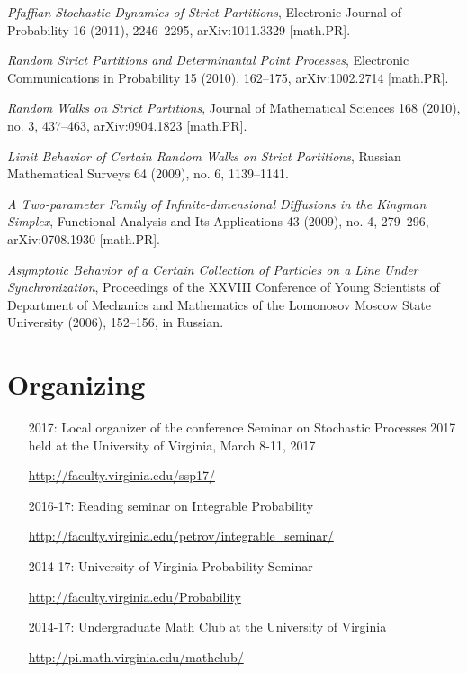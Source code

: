 \documentclass[letterpaper,11pt]{article}
\begin{document}
\begin{etaremune}
	      \emph{Pfaffian Stochastic Dynamics of Strict Partitions},
	      Electronic Journal of Probability 16 (2011), 2246--2295,
	      arXiv:1011.3329
	      [math.PR].
	\item
	      \emph{Random Strict Partitions and Determinantal Point
		      Processes},
	      Electronic Communications in Probability 15 (2010), 162--175,
	      arXiv:1002.2714
	      [math.PR].
	\item
	      \emph{Random Walks on Strict Partitions}, Journal of
	      Mathematical
	      Sciences 168 (2010), no. 3, 437--463, arXiv:0904.1823 [math.PR].
	\item
	      \emph{Limit Behavior of Certain Random Walks on Strict
		      Partitions},
	      Russian Mathematical Surveys 64 (2009), no. 6, 1139--1141.
	\item
	      \emph{A Two-parameter Family of Infinite-dimensional Diffusions
		      in
		      the Kingman Simplex}, Functional Analysis and Its
	      Applications 43 (2009), no.
	      4, 279--296, arXiv:0708.1930 [math.PR].
	\item
	      \emph{Asymptotic Behavior of a Certain Collection of Particles
		      on a Line
		      Under Synchronization}, Proceedings of the XXVIII
	      Conference of Young
	      Scientists of Department of Mechanics and Mathematics of the
	      Lomonosov Moscow
	      State University (2006), 152--156, in Russian.
\end{etaremune}

\section*{Organizing}

\begin{itemize}
	\item
	      [2017:] Local organizer of the conference
	      Seminar on Stochastic Processes 2017
	      held at the University of Virginia, March 8-11, 2017

	      \url{http://faculty.virginia.edu/ssp17/}
	\item
	      [2016-17:]
	      Reading seminar on Integrable Probability

	      \url{http://faculty.virginia.edu/petrov/integrable_seminar/}
	\item
	      [2014-17:] University of Virginia Probability Seminar

	      \url{http://faculty.virginia.edu/Probability}
	\item
	      [2014-17:]
	      Undergraduate Math Club
	      at the University of Virginia

	      \url{http://pi.math.virginia.edu/mathclub/}
\end{itemize}
\end{document}
